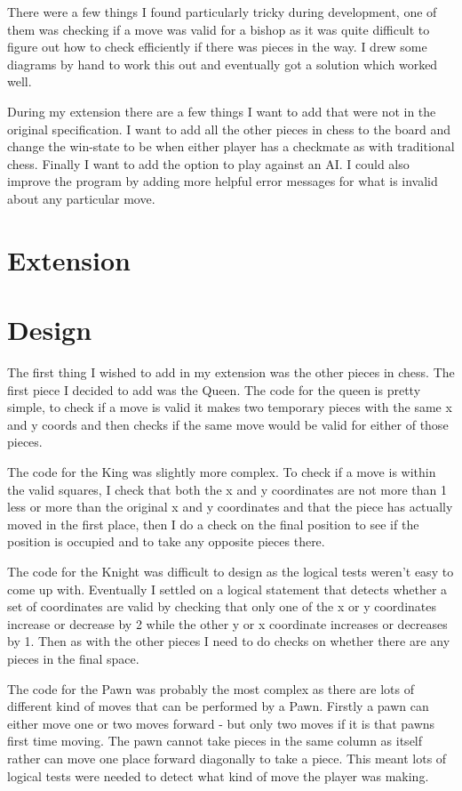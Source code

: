 \documentclass[a4paper]{article}
\begin{document}
There were a few things I found particularly tricky during development, one of them was checking if a move was valid for a bishop as it was quite difficult to figure out how to check efficiently if there was pieces in the way. I drew some diagrams by hand to work this out and eventually got a solution which worked well.

During my extension there are a few things I want to add that were not in the original specification. I want to add all the other pieces in chess to the board and change the win-state to be when either player has a checkmate as with traditional chess. Finally I want to add the option to play against an AI. I could also improve the program by adding more helpful error messages for what is invalid about any particular move.

\section*{Extension}
\section*{Design}
The first thing I wished to add in my extension was the other pieces in chess. The first piece I decided to add was the Queen. The code for the queen is pretty simple, to check if a move is valid it makes two temporary pieces with the same x and y coords and then checks if the same move would be valid for either of those pieces.

The code for the King was slightly more complex. To check if a move is within the valid squares, I check that both the x and y coordinates are not more than 1 less or more than the original x and y coordinates and that the piece has actually moved in the first place, then I do a check on the final position to see if the position is occupied and to take any opposite pieces there.

The code for the Knight was difficult to design as the logical tests weren't easy to come up with. Eventually I settled on a logical statement that detects whether a set of coordinates are valid by checking that only one of the x or y coordinates increase or decrease by 2 while the other y or x coordinate increases or decreases by 1. Then as with the other pieces I need to do checks on whether there are any pieces in the final space.

The code for the Pawn was probably the most complex as there are lots of different kind of moves that can be performed by a Pawn.  Firstly a pawn can either move one or two moves forward - but only two moves if it is that pawns first time moving. The pawn cannot take pieces in the same column as itself rather can move one place forward diagonally to take a piece. This meant lots of logical tests were needed to detect what kind of move the player was making.
\end{document}
